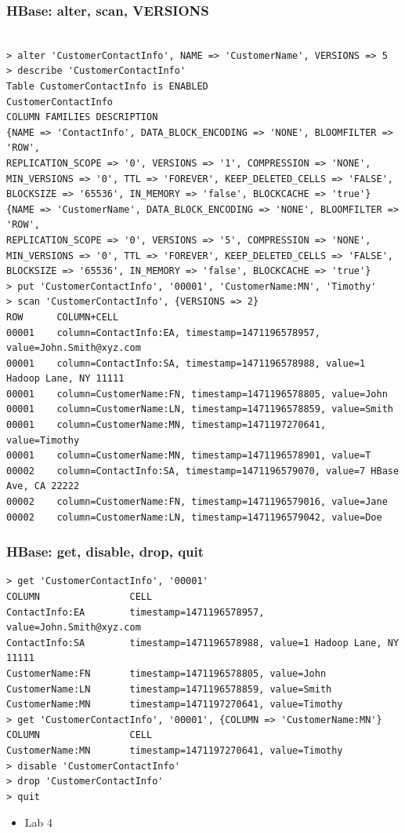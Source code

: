 \documentclass{beamer}
\begin{document}
\begin{frame}[fragile]
 \frametitle{HBase: alter, scan, VERSIONS}
{\color{mycolorcli}
  \begin{lstlisting}[frame=single, basicstyle=\tiny]

> alter 'CustomerContactInfo', NAME => 'CustomerName', VERSIONS => 5
> describe 'CustomerContactInfo'
Table CustomerContactInfo is ENABLED                                     
CustomerContactInfo
COLUMN FAMILIES DESCRIPTION
{NAME => 'ContactInfo', DATA_BLOCK_ENCODING => 'NONE', BLOOMFILTER => 'ROW', 
REPLICATION_SCOPE => '0', VERSIONS => '1', COMPRESSION => 'NONE', 
MIN_VERSIONS => '0', TTL => 'FOREVER', KEEP_DELETED_CELLS => 'FALSE', 
BLOCKSIZE => '65536', IN_MEMORY => 'false', BLOCKCACHE => 'true'}                                     
{NAME => 'CustomerName', DATA_BLOCK_ENCODING => 'NONE', BLOOMFILTER => 'ROW', 
REPLICATION_SCOPE => '0', VERSIONS => '5', COMPRESSION => 'NONE', 
MIN_VERSIONS => '0', TTL => 'FOREVER', KEEP_DELETED_CELLS => 'FALSE', 
BLOCKSIZE => '65536', IN_MEMORY => 'false', BLOCKCACHE => 'true'}
> put 'CustomerContactInfo', '00001', 'CustomerName:MN', 'Timothy'
> scan 'CustomerContactInfo', {VERSIONS => 2}
ROW      COLUMN+CELL 
00001    column=ContactInfo:EA, timestamp=1471196578957, value=John.Smith@xyz.com 
00001    column=ContactInfo:SA, timestamp=1471196578988, value=1 Hadoop Lane, NY 11111 
00001    column=CustomerName:FN, timestamp=1471196578805, value=John 
00001    column=CustomerName:LN, timestamp=1471196578859, value=Smith 
00001    column=CustomerName:MN, timestamp=1471197270641, value=Timothy 
00001    column=CustomerName:MN, timestamp=1471196578901, value=T 
00002    column=ContactInfo:SA, timestamp=1471196579070, value=7 HBase Ave, CA 22222 
00002    column=CustomerName:FN, timestamp=1471196579016, value=Jane 
00002    column=CustomerName:LN, timestamp=1471196579042, value=Doe
  \end{lstlisting}
}
\end{frame}

\begin{frame}[fragile]
 \frametitle{HBase: get, disable, drop, quit}
{\color{mycolorcli}
  \begin{lstlisting}[frame=single, basicstyle=\tiny]
> get 'CustomerContactInfo', '00001'
COLUMN                CELL 
ContactInfo:EA        timestamp=1471196578957, value=John.Smith@xyz.com 
ContactInfo:SA        timestamp=1471196578988, value=1 Hadoop Lane, NY 11111 
CustomerName:FN       timestamp=1471196578805, value=John 
CustomerName:LN       timestamp=1471196578859, value=Smith 
CustomerName:MN       timestamp=1471197270641, value=Timothy
> get 'CustomerContactInfo', '00001', {COLUMN => 'CustomerName:MN'}
COLUMN                CELL 
CustomerName:MN       timestamp=1471197270641, value=Timothy
> disable 'CustomerContactInfo'
> drop 'CustomerContactInfo'
> quit
  \end{lstlisting}
}
\begin{itemize}
\item Lab 4
\end{itemize}
\end{frame}
\end{document}
